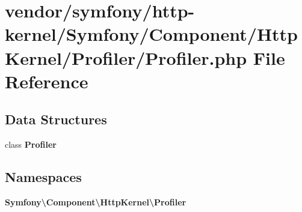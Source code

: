 \section{vendor/symfony/http-\/kernel/\+Symfony/\+Component/\+Http\+Kernel/\+Profiler/\+Profiler.php File Reference}
\label{_profiler_8php}
\subsection*{Data Structures}
\begin{DoxyCompactItemize}
\item 
class {\bf Profiler}
\end{DoxyCompactItemize}
\subsection*{Namespaces}
\begin{DoxyCompactItemize}
\item 
 {\bf Symfony\textbackslash{}\+Component\textbackslash{}\+Http\+Kernel\textbackslash{}\+Profiler}
\end{DoxyCompactItemize}
